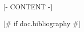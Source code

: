 \documentclass[a4paper,12pt,twoside]{book} %
\begin{document}
\sloppy  %

\frontmatter
\maketitle
\tableofcontents

\mainmatter  %


[- CONTENT -]


[# if doc.bibliography #]
\end{document}
